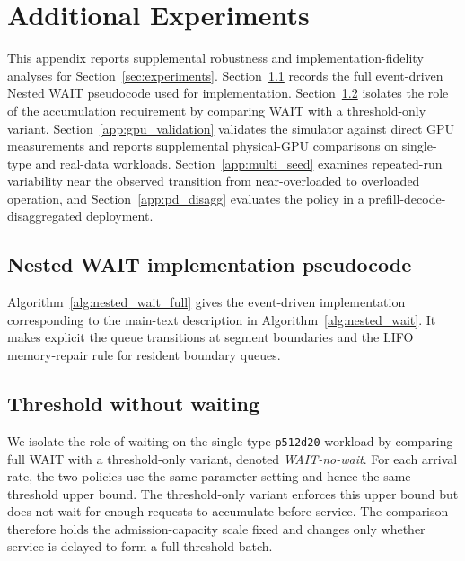 \section{Additional Experiments}
\label{app:additional_experiments}

This appendix reports supplemental robustness and implementation-fidelity analyses for Section~\ref{sec:experiments}. Section~\ref{app:nested_wait_pseudocode} records the full event-driven Nested WAIT pseudocode used for implementation. Section~\ref{app:no_wait} isolates the role of the accumulation requirement by comparing WAIT with a threshold-only variant. Section~\ref{app:gpu_validation} validates the simulator against direct GPU measurements and reports supplemental physical-GPU comparisons on single-type and real-data workloads. Section~\ref{app:multi_seed} examines repeated-run variability near the observed transition from near-overloaded to overloaded operation, and Section~\ref{app:pd_disagg} evaluates the policy in a prefill-decode-disaggregated deployment.

\subsection{Nested WAIT implementation pseudocode}
\label{app:nested_wait_pseudocode}

Algorithm~\ref{alg:nested_wait_full} gives the event-driven implementation corresponding to the main-text description in Algorithm~\ref{alg:nested_wait}. It makes explicit the queue transitions at segment boundaries and the LIFO memory-repair rule for resident boundary queues.



\subsection{Threshold without waiting}
\label{app:no_wait}

We isolate the role of waiting on the single-type \texttt{p512d20} workload by comparing full WAIT with a threshold-only variant, denoted \emph{WAIT-no-wait}. For each arrival rate, the two policies use the same parameter setting and hence the same threshold upper bound. The threshold-only variant enforces this upper bound but does not wait for enough requests to accumulate before service. The comparison therefore holds the admission-capacity scale fixed and changes only whether service is delayed to form a full threshold batch.

